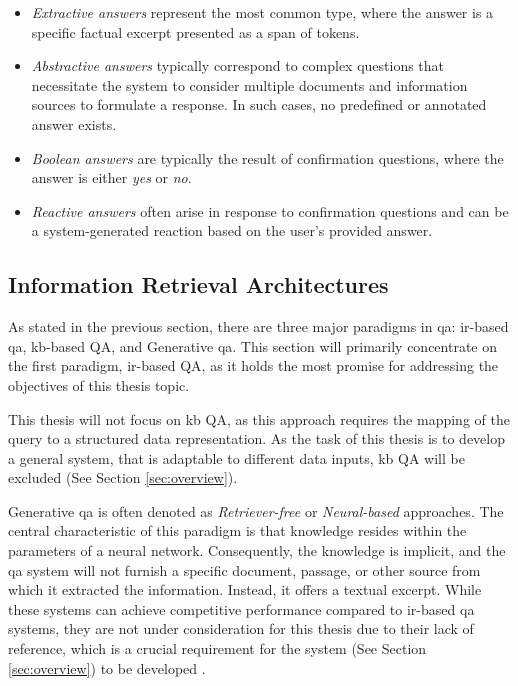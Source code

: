 \begin{itemize}
   \item \textit{Extractive answers} represent the most common type, where the answer is a specific factual excerpt presented as a span of tokens.

   \item \textit{Abstractive answers} typically correspond to complex questions that necessitate the system to consider multiple documents and information sources to formulate a response. In such cases, no predefined or annotated answer exists.

   \item \textit{Boolean answers} are typically the result of confirmation questions, where the answer is either \textit{yes} or \textit{no}.

   \item \textit{Reactive answers} often arise in response to confirmation questions and can be a system-generated reaction based on the user's provided answer.
\end{itemize}


\subsection{Information Retrieval Architectures}
\label{subsec:qa_architectures}

As stated in the previous section, there are three major paradigms in \gls{qa}: \gls{ir}-based \gls{qa}, \gls{kb}-based QA, and Generative \gls{qa}. This section will primarily concentrate on the first paradigm, \gls{ir}-based QA, as it holds the most promise for addressing the objectives of this thesis topic.

This thesis will not focus on \gls{kb} QA, as this approach requires the mapping of the query to a structured data representation. As the task of this thesis is to develop a general system, that is adaptable to different data inputs, \gls{kb} QA will be excluded \cite{dimitrakis_survey_2020} (See Section \ref{sec:overview}).

Generative \gls{qa} is often denoted as \textit{Retriever-free} or \textit{Neural-based} approaches. The central characteristic of this paradigm is that knowledge resides within the parameters of a neural network. Consequently, the knowledge is implicit, and the \gls{qa} system will not furnish a specific document, passage, or other source from which it extracted the information. Instead, it offers a textual excerpt. While these systems can achieve competitive performance compared to \gls{ir}-based \gls{qa} systems, they are not under consideration for this thesis due to their lack of reference, which is a crucial requirement for the system (See Section \ref{sec:overview}) to be developed \cite{roberts_how_2020}.


